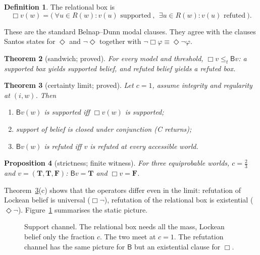 \documentclass[11pt,a4paper]{article}
\newtheorem{theorem}{Theorem}[section]
\newtheorem{proposition}[theorem]{Proposition}
\theoremstyle{definition}
\newtheorem{definition}[theorem]{Definition}
\theoremstyle{remark}
\newcommand{\Tv}{\mathbf{T}}\newcommand{\Fv}{\mathbf{F}}
\newcommand{\Bel}{\mathsf{B}}
\newcommand{\pos}[1]{\lVert #1\rVert^{+}}
\newcommand{\leqt}{\le_{t}}
\begin{document}
\begin{definition}
The relational box is
\[
\Box v(w)=\bigl(\ \forall u\in R(w)\colon v(u)\text{ supported}\ ,\ \
\exists u\in R(w)\colon v(u)\text{ refuted}\ \bigr).
\]
\end{definition}

These are the standard Belnap--Dunn modal clauses. They agree with the clauses Santos
states for $\Diamond$ and $\neg\Diamond$ together with $\neg\Box\varphi\equiv\Diamond\neg\varphi$.

\begin{theorem}[sandwich; proved]\label{thm:sandwich}
For every model and threshold, $\Box v\leqt \Bel v$: a supported box yields supported belief,
and refuted belief yields a refuted box.
\end{theorem}

\begin{theorem}[certainty limit; proved]\label{thm:certainty}
Let $c=1$, assume integrity and regularity at $(i,w)$. Then
\begin{enumerate}[label=(\alph*),nosep]
\item $\Bel v(w)$ is supported iff $\Box v(w)$ is supported;
\item support of belief is closed under conjunction \textup{(C returns)};
\item $\Bel v(w)$ is refuted iff $v$ is refuted at \emph{every} accessible world.
\end{enumerate}
\end{theorem}

\begin{proposition}[strictness; finite witness]\label{prop:strict}
For three equiprobable worlds, $c=\tfrac23$ and $v=(\Tv,\Tv,\Fv)$:
$\Bel v=\Tv$ and $\Box v=\Fv$.
\end{proposition}

Theorem~\ref{thm:certainty}(c) shows that the operators differ even in the limit:
refutation of Lockean belief is universal ($\Box\neg$), refutation of the relational box
is existential ($\Diamond\neg$). Figure~\ref{fig:channels} summarises the static picture.

\begin{figure}[t]
\centering
{}
\caption{Support channel. The relational box needs all the mass, Lockean belief only the
fraction $c$. The two meet at $c=1$. The refutation channel has the same picture for
$\Bel$ but an existential clause for $\Box$.}\label{fig:channels}
\end{figure}
\end{document}
